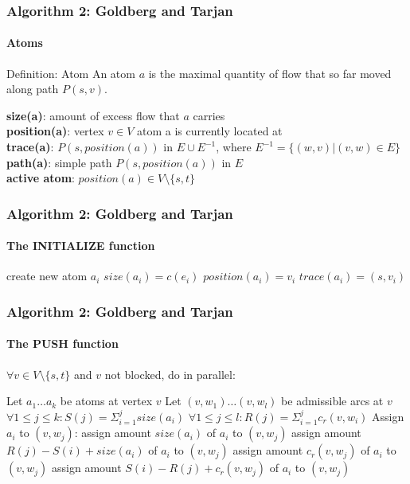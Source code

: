 \documentclass{beamer}
\begin{document}
\begin{frame}
\frametitle{Algorithm 2: Goldberg and Tarjan}
\framesubtitle{Atoms}
\begin{block}{Definition: Atom}
An atom $a$ is the maximal quantity of flow that so far moved along path $P(s,v)$.\\
\end{block}

\textbf{size(a)}: amount of excess flow that $a$ carries \\
\textbf{position(a)}: vertex $v\in V$ atom a is currently located at\\
\textbf{trace(a)}: $P(s, position(a))$ in $E \cup  E^{-1}$, where $E^{-1} = \{(w,v)\vert (v,w) \in E \}$ \\
\textbf{path(a)}: simple path $P(s, position(a))$ in $E$ \\
\textbf{active atom}: $position(a) \in V \setminus \{s, t\}$
\end{frame}

\begin{frame}
\frametitle{Algorithm 2: Goldberg and Tarjan}
\framesubtitle{The INITIALIZE function}
	\begin{algorithmic}[1]
		\State create new atom $a_i$
		\State $size(a_i) = c(e_i)$
		\State $position(a_i) = v_i$
		\State $trace(a_i) = (s,v_i)$		
	\EndFor
	\EndFunction
	\end{algorithmic}
\end{frame}

\begin{frame}[shrink]
\frametitle{Algorithm 2: Goldberg and Tarjan}
\framesubtitle{The PUSH function}
$\forall v \in V \setminus \{s,t\}$ and $v$ not blocked, do in parallel:
	\begin{algorithmic}[1]
	\State Let $a_1 \dots a_k$ be atoms at vertex $v$
	\State Let $(v,w_1) \dots (v,w_l)$ be admissible arcs at $v$
	\State $\forall 1 \leq j \leq k: S(j) = \Sigma_{i=1}^{j} size(a_i)$
	\State $\forall 1 \leq j \leq l: R(j) = \Sigma_{i=1}^{j} c_r(v,w_i)$
	\State Assign $a_i$ to $(v, w_j)$:
			\State assign amount $size(a_i)$ of $a_i$ to $(v,w_j)$
		\Else
			\State assign amount $R(j)-S(i)+size(a_i)$ of $a_i$ to $(v,w_j)$
		\EndIf
	\EndIf
			\State assign amount $c_r(v,w_j)$ of $a_i$ to $(v,w_j)$
		\Else
			\State assign amount $S(i)-R(j)+c_r(v,w_j)$ of $a_i$ to $(v,w_j)$
		\EndIf
	\EndIf
	\EndFunction
	\end{algorithmic}
\end{frame}
\end{document}
